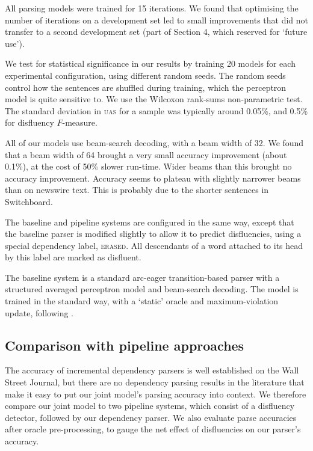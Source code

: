 \documentclass[11pt,letterpaper]{article}
\begin{document}
All parsing models were trained for 15 iterations.
We found that optimising the number of iterations on a development set led to
small improvements that did not transfer to a second development set (part of
Section 4, which \citet{Charniak01a} reserved for `future use').

We test for statistical significance in our results by training 20 models for
each experimental configuration, using different random seeds. The random seeds
control how the sentences are shuffled during training, which the perceptron
model is quite sensitive to.  We use the Wilcoxon rank-sums non-parametric test.
The standard deviation in \textsc{uas} for a sample was typically around 0.05\%,
and 0.5\% for disfluency $F$-measure.

All of our models use beam-search decoding, with a beam width of 32. We found that
a beam width of 64 brought a very small accuracy improvement (about 0.1\%), at
the cost of 50\% slower run-time. Wider beams than this brought no accuracy improvement.
Accuracy seems to plateau with slightly narrower beams than on newswire text.
This is probably due to the shorter sentences in Switchboard.

The baseline and pipeline systems are configured in the same way, except that
the baseline parser is modified slightly to allow it to predict disfluencies,
using a special dependency label, \textsc{erased}.  All descendants of a word 
attached to its head by this label are marked as disfluent.

The baseline system is a standard arc-eager
transition-based parser with a structured averaged perceptron model and beam-search
decoding.  The model is trained in the standard way, with a `static' oracle and
maximum-violation update, following \citep{huang:12}.


\subsection{Comparison with pipeline approaches}
\label{sec:pipeline}
The accuracy of incremental dependency parsers is well established on the Wall
Street Journal, but there are no dependency parsing results in the literature
that make it easy to put our joint model's parsing accuracy into context.
We therefore compare our joint model to two pipeline systems, which consist of 
a disfluency detector, followed by our dependency parser.
We also evaluate parse accuracies after oracle pre-processing, to
gauge the net effect of disfluencies on our parser's accuracy.
\end{document}
